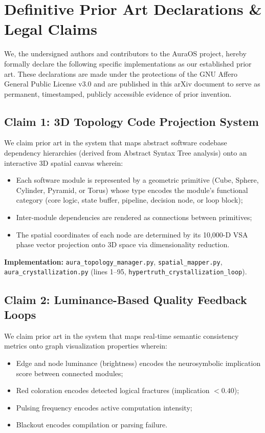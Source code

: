 \documentclass[11pt]{article}
\begin{document}
\section{Definitive Prior Art Declarations \& Legal Claims}\label{sec:claims}

We, the undersigned authors and contributors to the AuraOS project, hereby formally declare the following specific implementations as our established prior art. These declarations are made under the protections of the GNU Affero General Public License v3.0 and are published in this arXiv document to serve as permanent, timestamped, publicly accessible evidence of prior invention.

\subsection{Claim 1: 3D Topology Code Projection System}

We claim prior art in the system that maps abstract software codebase dependency hierarchies (derived from Abstract Syntax Tree analysis) onto an interactive 3D spatial canvas wherein:
\begin{itemize}
    \item Each software module is represented by a geometric primitive (Cube, Sphere, Cylinder, Pyramid, or Torus) whose type encodes the module's functional category (core logic, state buffer, pipeline, decision node, or loop block);
    \item Inter-module dependencies are rendered as connections between primitives;
    \item The spatial coordinates of each node are determined by its 10,000-D VSA phase vector projection onto 3D space via dimensionality reduction.
\end{itemize}

\textbf{Implementation:} \texttt{aura\_topology\_manager.py}, \texttt{spatial\_mapper.py}, \texttt{aura\_crystallization.py} (lines 1--95, \texttt{hypertruth\_crystallization\_loop}).

\subsection{Claim 2: Luminance-Based Quality Feedback Loops}

We claim prior art in the system that maps real-time semantic consistency metrics onto graph visualization properties wherein:
\begin{itemize}
    \item Edge and node luminance (brightness) encodes the neurosymbolic implication score between connected modules;
    \item Red coloration encodes detected logical fractures (implication $< 0.40$);
    \item Pulsing frequency encodes active computation intensity;
    \item Blackout encodes compilation or parsing failure.
\end{itemize}
\end{document}
